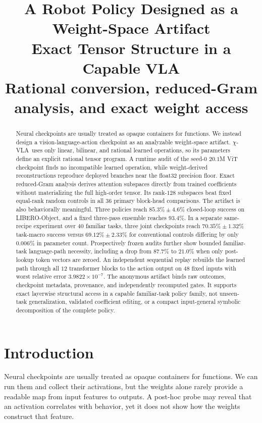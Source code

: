 \documentclass{article}
\title{\textbf{A Robot Policy Designed as a Weight-Space Artifact}\\[0.15em]
\textbf{Exact Tensor Structure in a Capable VLA}\\[0.35em]
\large Rational conversion, reduced-Gram analysis, and exact weight access}
\author{}
\date{}
\newcommand{\chivla}{$\chi$-VLA}
\begin{document}
\maketitle

\begin{abstract}
Neural checkpoints are usually treated as opaque containers for functions. We instead design a
vision-language-action checkpoint as an analyzable weight-space artifact. \chivla\ uses only
linear, bilinear, and rational learned operations, so its parameters define an explicit rational
tensor program. A runtime audit of the seed-$0$ $20.1$M ViT checkpoint finds no incompatible
learned operation, while weight-derived reconstructions reproduce deployed branches near the
float32 precision floor. Exact reduced-Gram analysis derives attention subspaces directly from
trained coefficients without materializing the full high-order tensor. Its rank-$128$ subspaces
beat fixed equal-rank random controls in all $36$ primary block-head comparisons. The artifact is
also behaviorally meaningful. Three policies reach $85.3\%\pm4.6\%$ closed-loop success on
LIBERO-Object, and a fixed three-pass ensemble reaches $93.4\%$. In a separate same-recipe
experiment over $40$ familiar tasks, three joint checkpoints reach $70.35\%\pm1.32\%$ task-macro
success versus $69.12\%\pm2.33\%$ for conventional controls differing by only $0.006\%$ in
parameter count. Prospectively frozen audits further show bounded familiar-task language-path
necessity, including a drop from $87.7\%$ to $21.0\%$ when only post-lookup token vectors are
zeroed. An independent sequential replay rebuilds the learned path through all $12$ transformer
blocks to the action output on $48$ fixed inputs with worst relative error
$3.9822\times10^{-7}$. The anonymous artifact binds raw outcomes, checkpoint metadata,
provenance, and independently recomputed gates. It supports exact layerwise structural access in
a capable familiar-task policy family, not unseen-task generalization, validated coefficient
editing, or a compact input-general symbolic decomposition of the complete policy.
\end{abstract}

\section{Introduction}

Neural checkpoints are usually treated as opaque containers for functions. We can run them and
collect their activations, but the weights alone rarely provide a readable map from input
features to outputs. A post-hoc probe may reveal that an activation correlates with behavior,
yet it does not show how the weights construct that feature.
\end{document}
